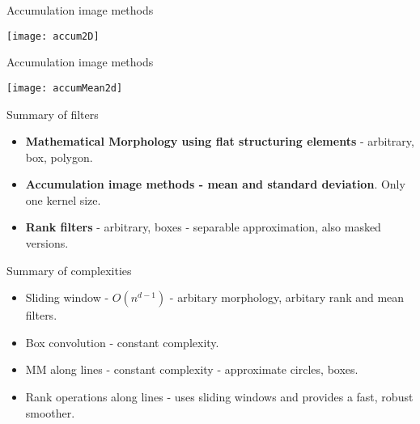 \documentclass[pdf,prettybox]{prosper}
\begin{document}
\begin{slide}{Accumulation image methods}
\vspace{0.4cm}
\begin{centering}
\begin{figure*}
\texttt{[image: accum2D]}
\end{figure*}
\end{centering}
\end{slide}

\begin{slide}{Accumulation image methods}
\vspace{0.4cm}
\begin{centering}
\begin{figure*}
\texttt{[image: accumMean2d]}
\end{figure*}
\end{centering}
\end{slide}

\begin{slide}{Summary of filters}
\begin{itemize}
\item {\bf Mathematical Morphology using flat structuring elements} - arbitrary, box, polygon.
\item {\bf Accumulation image methods - mean and standard deviation}. Only one kernel size.
\item {\bf Rank filters} - arbitrary, boxes - separable approximation, also masked versions.
\end{itemize}
\end{slide}

\begin{slide}{Summary of complexities}
\begin{itemize}
\item Sliding window - $O(n^{d-1})$ - arbitary morphology, arbitary rank and mean filters.
\item Box convolution - constant complexity.
\item MM along lines - constant complexity - approximate circles, boxes.
\item Rank operations along lines - uses sliding windows and provides a fast, robust smoother.
\end{itemize}
\end{slide}
\end{document}

